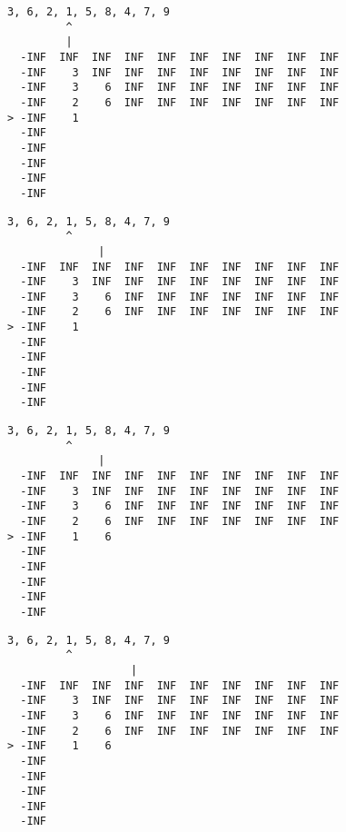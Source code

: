 { \begin{verbatim}
3, 6, 2, 1, 5, 8, 4, 7, 9
         ^
         |
  -INF  INF  INF  INF  INF  INF  INF  INF  INF  INF
  -INF    3  INF  INF  INF  INF  INF  INF  INF  INF
  -INF    3    6  INF  INF  INF  INF  INF  INF  INF
  -INF    2    6  INF  INF  INF  INF  INF  INF  INF
> -INF    1                                        
  -INF                                             
  -INF                                             
  -INF                                             
  -INF                                             
  -INF                                             
\end{verbatim} }

{ \begin{verbatim}
3, 6, 2, 1, 5, 8, 4, 7, 9
         ^
              |
  -INF  INF  INF  INF  INF  INF  INF  INF  INF  INF
  -INF    3  INF  INF  INF  INF  INF  INF  INF  INF
  -INF    3    6  INF  INF  INF  INF  INF  INF  INF
  -INF    2    6  INF  INF  INF  INF  INF  INF  INF
> -INF    1                                        
  -INF                                             
  -INF                                             
  -INF                                             
  -INF                                             
  -INF                                             
\end{verbatim} }

{ \begin{verbatim}
3, 6, 2, 1, 5, 8, 4, 7, 9
         ^
              |
  -INF  INF  INF  INF  INF  INF  INF  INF  INF  INF
  -INF    3  INF  INF  INF  INF  INF  INF  INF  INF
  -INF    3    6  INF  INF  INF  INF  INF  INF  INF
  -INF    2    6  INF  INF  INF  INF  INF  INF  INF
> -INF    1    6                                   
  -INF                                             
  -INF                                             
  -INF                                             
  -INF                                             
  -INF                                             
\end{verbatim} }

{ \begin{verbatim}
3, 6, 2, 1, 5, 8, 4, 7, 9
         ^
                   |
  -INF  INF  INF  INF  INF  INF  INF  INF  INF  INF
  -INF    3  INF  INF  INF  INF  INF  INF  INF  INF
  -INF    3    6  INF  INF  INF  INF  INF  INF  INF
  -INF    2    6  INF  INF  INF  INF  INF  INF  INF
> -INF    1    6                                   
  -INF                                             
  -INF                                             
  -INF                                             
  -INF                                             
  -INF                                             
\end{verbatim} }

